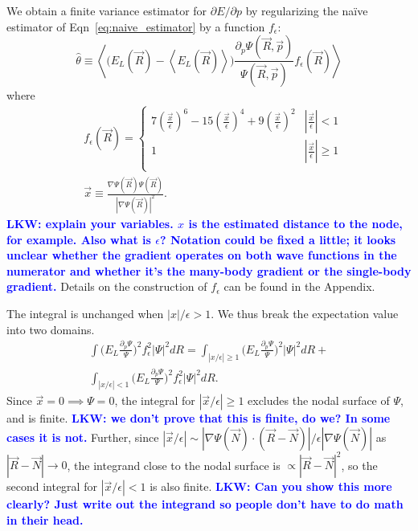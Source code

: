 \documentclass[twocolumn]{revtex4-1}
\newcommand{\lucas}[1]{\textbf{\textcolor{blue}{LKW: #1}}}
\begin{document}
We obtain a finite variance estimator for $\partial E/\partial p$ by regularizing the na\"ive estimator of Eqn~\ref{eq:naive_estimator} by a function $f_\epsilon$:
\begin{equation}
\hat{\theta} \equiv \left\langle \Big(E_L(\vec{R})  - \left\langle E_L(\vec{R}) \right \rangle\Big)\frac{\partial_p \Psi(\vec{R}, \vec{p})}{\Psi(\vec{R}, \vec{p})} f_\epsilon(\vec{R}) \right\rangle
\label{eq:regularized_estimator}
\end{equation}
where 
\begin{equation}
\begin{split}
&f_\epsilon(\vec{R}) = \begin{cases} 
     7(\frac{\vec{x}}{\epsilon})^6 - 15(\frac{\vec{x}}{\epsilon})^4 + 9(\frac{\vec{x}}{\epsilon})^2 & |\frac{\vec{x}}{\epsilon}| < 1 \\
      1 & |\frac{\vec{x}}{\epsilon}| \ge 1 \\
   \end{cases}\\ 
 &\vec{x} \equiv \frac{\nabla \Psi(\vec{R}) \Psi(\vec{R})}{|\nabla \Psi(\vec{R})|^2}.
\end{split}
\label{eq:regularizing_function}
\end{equation} 
\lucas{explain your variables. $x$ is the estimated distance to the node, for example. Also what is $\epsilon$? Notation could be fixed a little; it looks unclear whether the gradient operates on both wave functions in the numerator and whether it's the many-body gradient or the single-body gradient.}
Details on the construction of $f_\epsilon$ can be found in the Appendix.

The integral is unchanged when $|x|/\epsilon > 1$. 
We thus break the expectation value into two domains. 
\begin{equation}
\begin{split}
\int \Big(E_L\frac{\partial_p\Psi}{\Psi}\Big)^2 f_\epsilon^2 |\Psi|^2 dR = \int_{|x/\epsilon|\geq 1} \Big(E_L\frac{\partial_p\Psi}{\Psi}\Big)^2 |\Psi|^2 dR +\\ \int_{|x/\epsilon|< 1} \Big(E_L\frac{\partial_p\Psi}{\Psi}\Big)^2 f_\epsilon^2 |\Psi|^2 dR.
\end{split}
\label{eq:convergent_integral}
\end{equation}
Since $\vec{x} = 0 \implies \Psi = 0$, the integral for $|\vec{x}/\epsilon|\geq 1$  excludes the nodal surface of $\Psi$, and is finite.
\lucas{we don't prove that this is finite, do we? In some cases it is not.} 
Further, since $|\vec{x}/\epsilon| \sim |\nabla\Psi(\vec{N}) \cdot (\vec{R}-\vec{N})|/\epsilon|\nabla  \Psi(\vec{N})|$ as $|\vec{R} - \vec{N}| \rightarrow 0$, the integrand close to the nodal surface is $\propto |\vec{R} - \vec{N}|^2$, so the second integral for $|\vec{x}/\epsilon| < 1$ is also finite.
\lucas{Can you show this more clearly? Just write out the integrand so people don't have to do math in their head.}
\end{document}
